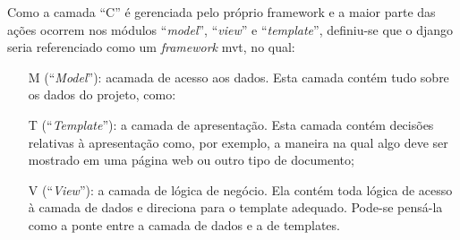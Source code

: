 \begin{description}
\begin{itemize}
        \end{itemize}
        Como a camada ``C'' é gerenciada pelo próprio framework e a maior parte das ações ocorrem nos módulos ``\textit{model}'', ``\textit{view}'' e ``\textit{template}'', definiu-se que o \gls{django} seria referenciado como um \textit{framework} \gls{mvt}, no qual:
        \begin{itemize}
	        \item[M](``\textit{Model}''): acamada de acesso aos dados. Esta camada contém tudo sobre os dados do projeto, como:
	        \item[T](``\textit{Template}''): a camada de apresentação. Esta camada contém decisões relativas à apresentação como, por exemplo, a maneira na qual algo deve ser mostrado em uma página web ou outro tipo de documento;
            \item[V](``\textit{View}''): a camada de lógica de negócio. Ela contém toda lógica de acesso à camada de dados e direciona para o template adequado. Pode-se pensá-la como a ponte entre a camada de dados e a de templates.
        \end{itemize}
\end{description}